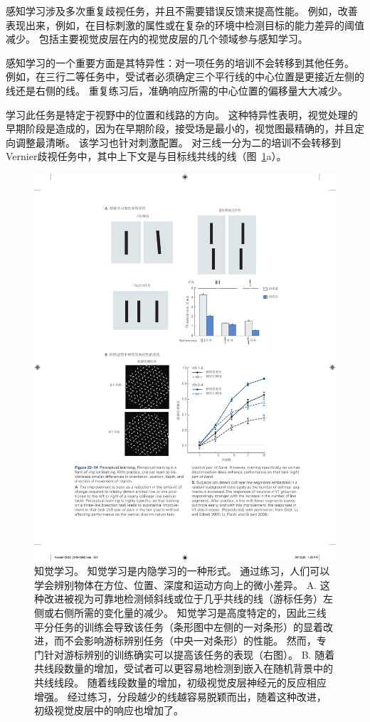感知学习涉及多次重复歧视任务，并且不需要错误反馈来提高性能。
例如，改善表现出来，例如，在目标刺激的属性或在复杂的环境中检测目标的能力差异的阈值减少。
包括主要视觉皮层在内的视觉皮层的几个领域参与感知学习。


感知学习的一个重要方面是其特异性：对一项任务的培训不会转移到其他任务。
例如，在三行二等任务中，受试者必须确定三个平行线的中心位置是更接近左侧的线还是右侧的线。
重复练习后，准确响应所需的中心位置的偏移量大大减少。


学习此任务是特定于视野中的位置和线路的方向。
这种特异性表明，视觉处理的早期阶段是造成的，因为在早期阶段，接受场是最小的，视觉图最精确的，并且定向调整最清晰。
该学习也针对刺激配置。
对三线一分为二的培训不会转移到Vernier歧视任务中，其中上下文是与目标线共线的线（图~\ref{fig:23_14}a）。


\begin{figure}[htbp]
	\centering
	\includegraphics[width=0.65\linewidth]{chap23/fig_23_14}
	\caption{知觉学习。
		知觉学习是内隐学习的一种形式。
		通过练习，人们可以学会辨别物体在方位、位置、深度和运动方向上的微小差异。
		A. 这种改进被视为可靠地检测倾斜线或位于几乎共线的线（游标任务）左侧或右侧所需的变化量的减少。
		知觉学习是高度特定的，因此三线平分任务的训练会导致该任务（条形图中左侧的一对条形）的显着改进，而不会影响游标辨别任务（中央一对条形）的性能。
		然而，专门针对游标辨别的训练确实可以提高该任务的表现（右图）。
		B. 随着共线段数量的增加，受试者可以更容易地检测到嵌入在随机背景中的共线线段。
		随着线段数量的增加，初级视觉皮层神经元的反应相应增强。
		经过练习，分段越少的线越容易脱颖而出，随着这种改进，初级视觉皮层中的响应也增加了\cite{crist2001learning,li2008learning}。}
	\label{fig:23_14}
\end{figure}


